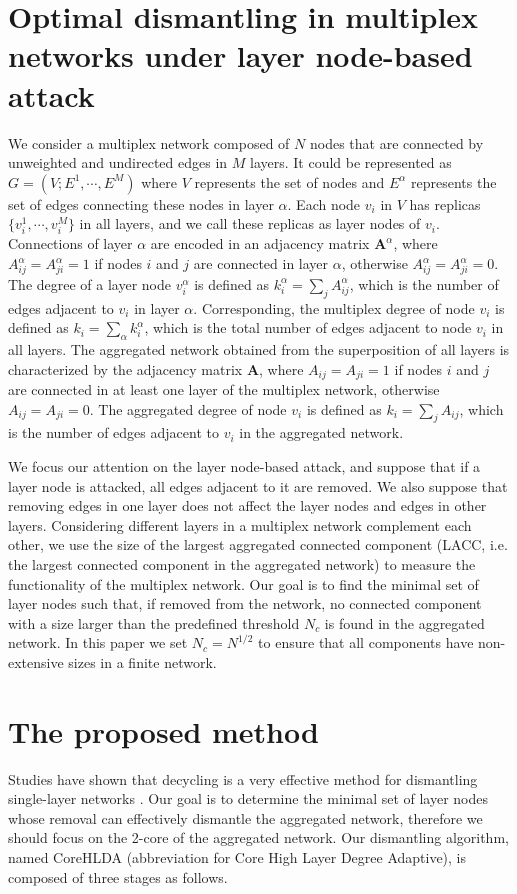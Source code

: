 \documentclass[%
 aip,
 cha,
 amsmath,amssymb,
 reprint,%
]{revtex4-1}
\begin{document}
\section{\label{sec2}Optimal dismantling in multiplex networks under layer node-based attack}

We consider a multiplex network composed of $N$ nodes that are connected by unweighted and undirected edges in $M$ layers. It could be represented as $G=(V; E^1, \cdots, E^M)$ where $V$ represents the set of nodes and $E^\alpha$ represents the set of edges connecting these nodes in layer $\alpha$. Each node $v_i$ in $V$ has replicas $\{v_i^1,\cdots,v_i^M\}$ in all layers, and we call these replicas as layer nodes of $v_i$. Connections of layer $\alpha$ are encoded in an adjacency matrix $\mathbf{A}^\alpha$, where $A^\alpha_{ij}=A^\alpha_{ji}=1$ if nodes $i$ and $j$ are connected in layer $\alpha$, otherwise $A^\alpha_{ij}=A^\alpha_{ji}=0$. The degree of a layer node $v_i^\alpha$ is defined as $k_i^\alpha=\sum_j A_{ij}^\alpha$, which is the number of edges adjacent to $v_i$ in layer $\alpha$. Corresponding, the multiplex degree of node $v_i$ is defined as $k_i=\sum_\alpha k_i^\alpha$, which is the total number of edges adjacent to node $v_i$ in all layers. The aggregated network obtained from the superposition of all layers is characterized by the adjacency matrix $\mathbf{A}$, where $A_{ij}=A_{ji}=1$ if nodes $i$ and $j$ are connected in at least one layer of the multiplex network, otherwise $A_{ij}=A_{ji}=0$. The aggregated degree of node $v_i$ is defined as $k_i=\sum_j A_{ij}$, which is the number of edges adjacent to $v_i$ in the aggregated network.

We focus our attention on the layer node-based attack, and suppose that if a layer node is attacked, all edges adjacent to it are removed. We also suppose that removing edges in one layer does not affect the layer nodes and edges in other layers. Considering different layers in a multiplex network complement each other, we use the size of the largest aggregated connected component (LACC, i.e. the largest connected component in the aggregated network) to measure the functionality of the multiplex network. Our goal is to find the minimal set of layer nodes such that, if removed from the network, no connected component with a size larger than the predefined threshold $N_c$ is found in the aggregated network. In this paper we set $N_c=N^{1/2}$ to ensure that all components have non-extensive sizes in a finite network.

\section{\label{sec3}The proposed method}
Studies have shown that decycling is a very effective method for dismantling single-layer networks \cite{Braunstein12368,PhysRevE.94.012305,Zdeborova2016}. Our goal is to determine the minimal set of layer nodes whose removal can effectively dismantle the aggregated network, therefore we should focus on the 2-core of the aggregated network. Our dismantling algorithm, named CoreHLDA (abbreviation for Core High Layer Degree Adaptive), is composed of three stages as follows.
\end{document}
